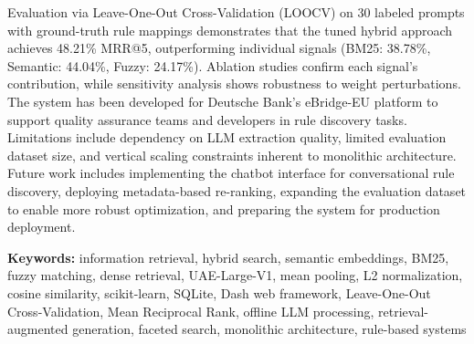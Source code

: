 Evaluation via Leave-One-Out Cross-Validation (LOOCV) on 30 labeled prompts with ground-truth rule mappings demonstrates that the tuned hybrid approach achieves 48.21\% MRR@5, outperforming individual signals (BM25: 38.78\%, Semantic: 44.04\%, Fuzzy: 24.17\%). Ablation studies confirm each signal's contribution, while sensitivity analysis shows robustness to weight perturbations. The system has been developed for Deutsche Bank's eBridge-EU platform to support quality assurance teams and developers in rule discovery tasks. Limitations include dependency on LLM extraction quality, limited evaluation dataset size, and vertical scaling constraints inherent to monolithic architecture. Future work includes implementing the chatbot interface for conversational rule discovery, deploying metadata-based re-ranking, expanding the evaluation dataset to enable more robust optimization, and preparing the system for production deployment.

\medskip
\noindent\textbf{Keywords:} information retrieval, hybrid search, semantic embeddings, BM25, fuzzy matching, dense retrieval, UAE-Large-V1, mean pooling, L2 normalization, cosine similarity, scikit-learn, SQLite, Dash web framework, Leave-One-Out Cross-Validation, Mean Reciprocal Rank, offline LLM processing, retrieval-augmented generation, faceted search, monolithic architecture, rule-based systems